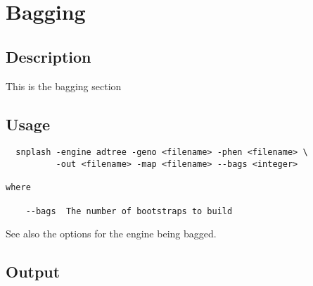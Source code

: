 \section{Bagging}
\label{sec:bagging}
\subsection{Description}
This is the bagging section
\subsection{Usage}
\begin{verbatim}
  snplash -engine adtree -geno <filename> -phen <filename> \
          -out <filename> -map <filename> --bags <integer>
             
where

    --bags  The number of bootstraps to build
\end{verbatim}

See also the options for the engine being bagged.

\subsection{Output}





